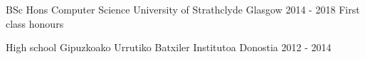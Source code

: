 

\begin{cventries}

  \cventry
    {BSc Hons Computer Science} %
    {University of Strathclyde} %
    {Glasgow} %
    {2014 - 2018} %
    {First class honours}

  \cventry
    {High school} %
    {Gipuzkoako Urrutiko Batxiler Institutoa} %
    {Donostia} %
    {2012 - 2014} %
    {}

\end{cventries}

